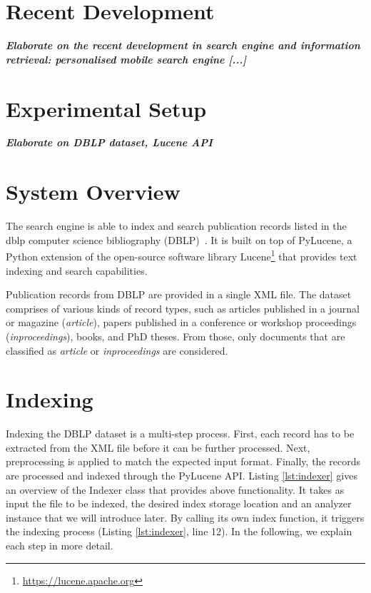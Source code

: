 \documentclass{sig-alternate-05-2015}
\begin{document}
\section{Recent Development}
\textit{\textbf{Elaborate on the recent development in search engine and information retrieval: personalised mobile search engine [...]}}
\section{Experimental Setup}
\textit{\textbf{Elaborate on DBLP dataset, Lucene API}}

\section{System Overview}

The search engine is able to index and search publication records listed in the dblp computer science bibliography (DBLP)~\cite{dblp}. It is built on top of PyLucene, a Python extension of the open-source software library Lucene\footnote{\url{https://lucene.apache.org}} that provides text indexing and search capabilities.

Publication records from DBLP are provided in a single XML file. The dataset comprises of various kinds of record types, such as articles published in a journal or magazine (\emph{article}), papers published in a conference or workshop proceedings (\emph{inproceedings}), books, and PhD theses. From those, only documents that are classified as \emph{article} or \emph{inproceedings} are considered.

\section{Indexing}

Indexing the DBLP dataset is a multi-step process. First, each record has to be extracted from the XML file before it can be further processed. Next, preprocessing is applied to match the expected input format. Finally, the records are processed and indexed through the PyLucene API. Listing \ref{lst:indexer} gives an overview of the Indexer class that provides above functionality. It takes as input the file to be indexed, the desired index storage location and an analyzer instance that we will introduce later. By calling its own index function, it triggers the indexing process (Listing \ref{lst:indexer}, line 12). In the following, we explain each step in more detail.
\end{document}
